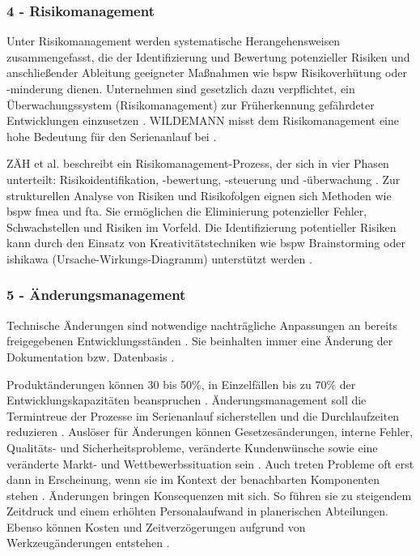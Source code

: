 \subsubsection*{4 - Risikomanagement}
Unter Risikomanagement werden systematische Herangehensweisen zusammengefasst, die der Identifizierung und Bewertung potenzieller Risiken und anschließender Ableitung geeigneter Maßnahmen wie \gls{bspw} Risikoverhütung oder -minderung dienen. %
Unternehmen sind gesetzlich dazu verpflichtet, ein Überwachungssystem (Risikomanagement) zur Früherkennung gefährdeter Entwicklungen einzusetzen \autocite[302]{Burghardt2006}.
WILDEMANN misst dem Risikomanagement eine hohe Bedeutung für den Serienanlauf bei \autocite{Wildemann2004}. 

ZÄH et al. beschreibt ein Risikomanagement-Prozess, der sich in vier Phasen unterteilt: Risikoidentifikation, -bewertung, -steuerung und -überwachung \autocite{Zaeh2004}. 
Zur strukturellen Analyse von Risiken und Risikofolgen eignen sich  Methoden wie \gls{bspw} \gls{fmea} und \gls{fta}. Sie ermöglichen die Eliminierung potenzieller Fehler, Schwachstellen und Risiken im Vorfeld.
Die Identifizierung potentieller Risiken kann durch den Einsatz von Kreativitätstechniken wie \gls{bspw} Brainstorming oder \gls{ishikawa} (Ursache-Wirkungs-Diagramm) unterstützt werden \autocite[41]{Bischoff2007}. 

\subsubsection*{5 - Änderungsmanagement}

Technische Änderungen sind notwendige nachträgliche Anpassungen an bereits freigegebenen Entwicklungsständen \autocite{Zanner2002}. Sie beinhalten immer eine Änderung der Dokumentation bzw. Datenbasis \autocite[47]{Niemerg1997}. 	

Produktänderungen können 30 bis 50\%, in Einzelfällen bis zu 70\% der Entwicklungskapazitäten beanspruchen \autocite[2]{Lindemann1998}.
Änderungsmanagement soll die Termintreue der Prozesse im Serienanlauf sicherstellen und die Durchlaufzeiten reduzieren \autocite[216]{Schuh2008}. 
Auslöser für Änderungen können Gesetzesänderungen, interne Fehler, Qualitäts- und Sicherheitsprobleme, veränderte Kundenwünsche sowie eine veränderte Markt- und Wettbewerbssituation sein \autocite{Zanner2002}. Auch treten Probleme oft erst dann in Erscheinung, wenn sie im Kontext der benachbarten Komponenten stehen \autocite[24]{Kuhn2002}.
Änderungen bringen Konsequenzen mit sich. So führen sie zu steigendem Zeitdruck und einem erhöhten Personalaufwand in planerischen Abteilungen. Ebenso können Kosten und Zeitverzögerungen aufgrund von Werkzeugänderungen entstehen \autocite[24]{Kuhn2002}. 

